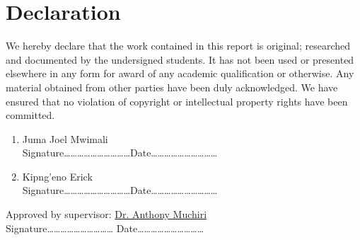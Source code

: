 \section*{Declaration}


We hereby declare that the work contained in this report is original; researched and documented by the undersigned students. It has not been used or presented elsewhere in any form for award of any academic qualification or otherwise. Any material obtained from other parties have been duly acknowledged. We have ensured that no violation of copyright or intellectual property rights have been committed.
\begin{enumerate}
	\item Juma Joel Mwimali \vspace*{.2cm}\\
	Signature\ldots\ldots\ldots\ldots\ldots\ldots\ldots\ldots\ldots\ldots Date\ldots\ldots\ldots\ldots\ldots\ldots\ldots\ldots\ldots\ldots
	\item Kipng'eno Erick \vspace*{.2cm}\\
	Signature\ldots\ldots\ldots\ldots\ldots\ldots\ldots\ldots\ldots\ldots Date\ldots\ldots\ldots\ldots\ldots\ldots\ldots\ldots\ldots\ldots
\end{enumerate}

\vspace*{1cm}
Approved by supervisor: \underline{Dr. Anthony Muchiri} \\
Signature\ldots\ldots\ldots\ldots\ldots\ldots\ldots\ldots\ldots\ldots
\vspace*{2cm}
Date\ldots\ldots\ldots\ldots\ldots\ldots\ldots\ldots\ldots\ldots \\



